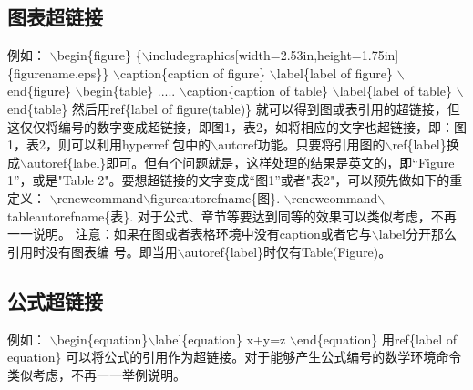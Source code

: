 \subsection{图表超链接}
例如： \newline $\backslash $begin{\{}figure{\}} \newline
{\{}$\backslash
$includegraphics[width=2.53in,height=1.75in]{\{}figurename.eps{\}}{\}}
\newline
$\backslash $caption{\{}caption of figure{\}} $\backslash
$label{\{}label of figure{\}} \newline $\backslash
$end{\{}figure{\}} \newline $\backslash $begin{\{}table{\}} \newline
..... $\backslash $caption{\{}caption of table{\}} $\backslash
$label{\{}label of table{\}} \newline $\backslash $end{\{}table{\}}
\newline 然后用ref{\{}label of figure(table){\}}
就可以得到图或表引用的超链接，但这仅仅将编号的数字变成超链接，即图1，表2，如将相应的文字也超链接，即：图1，表2，则可以利用hyperref
包中的$\backslash $autoref功能。只要将引用图的$\backslash
$ref{\{}label{\}}换成$\backslash
$autoref{\{}label{\}}即可。但有个问题就是，这样处理的结果是英文的，即``Figure
1''，或是"Table
2"。要想超链接的文字变成``图1''或者"表2"，可以预先做如下的重定义：
\newline $\backslash $renewcommand$\backslash
$figureautorefname{\{}图{\}}. $\backslash $renewcommand$\backslash
$tableautorefname{\{}表{\}}. \newline
对于公式、章节等要达到同等的效果可以类似考虑，不再一一说明。
\newline 注意：如果在图或者表格环境中没有caption或者它与$\backslash
$label分开那么引用时没有图表编 \newline 号。即当用$\backslash
$autoref{\{}label{\}}时仅有Table(Figure)。 \newline

\subsection{公式超链接}
例如： \newline $\backslash $begin{\{}equation{\}}$\backslash
$label{\{}equation{\}}
\newline
x+y=z \newline $\backslash $end{\{}equation{\}} \newline
用ref{\{}label of equation{\}}
可以将公式的引用作为超链接。对于能够产生公式编号的数学环境命令类似考虑，不再一一举例说明。
\newline

